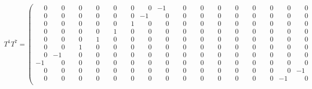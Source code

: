 \documentclass[10pt]{article}
\begin{document}
\[
T^{1}T^{7} = \left(\begin{smallmatrix}
\phantom{-}0 & \phantom{-}0 & \phantom{-}0 & \phantom{-}0 & \phantom{-}0 & \phantom{-}0 & \phantom{-}0 & -1 & \phantom{-}0 & \phantom{-}0 & \phantom{-}0 & \phantom{-}0 & \phantom{-}0 & \phantom{-}0 & \phantom{-}0 & \phantom{-}0 \\
\phantom{-}0 & \phantom{-}0 & \phantom{-}0 & \phantom{-}0 & \phantom{-}0 & \phantom{-}0 & -1 & \phantom{-}0 & \phantom{-}0 & \phantom{-}0 & \phantom{-}0 & \phantom{-}0 & \phantom{-}0 & \phantom{-}0 & \phantom{-}0 & \phantom{-}0 \\
\phantom{-}0 & \phantom{-}0 & \phantom{-}0 & \phantom{-}0 & \phantom{-}0 & \phantom{-}1 & \phantom{-}0 & \phantom{-}0 & \phantom{-}0 & \phantom{-}0 & \phantom{-}0 & \phantom{-}0 & \phantom{-}0 & \phantom{-}0 & \phantom{-}0 & \phantom{-}0 \\
\phantom{-}0 & \phantom{-}0 & \phantom{-}0 & \phantom{-}0 & \phantom{-}1 & \phantom{-}0 & \phantom{-}0 & \phantom{-}0 & \phantom{-}0 & \phantom{-}0 & \phantom{-}0 & \phantom{-}0 & \phantom{-}0 & \phantom{-}0 & \phantom{-}0 & \phantom{-}0 \\
\phantom{-}0 & \phantom{-}0 & \phantom{-}0 & \phantom{-}1 & \phantom{-}0 & \phantom{-}0 & \phantom{-}0 & \phantom{-}0 & \phantom{-}0 & \phantom{-}0 & \phantom{-}0 & \phantom{-}0 & \phantom{-}0 & \phantom{-}0 & \phantom{-}0 & \phantom{-}0 \\
\phantom{-}0 & \phantom{-}0 & \phantom{-}1 & \phantom{-}0 & \phantom{-}0 & \phantom{-}0 & \phantom{-}0 & \phantom{-}0 & \phantom{-}0 & \phantom{-}0 & \phantom{-}0 & \phantom{-}0 & \phantom{-}0 & \phantom{-}0 & \phantom{-}0 & \phantom{-}0 \\
\phantom{-}0 & -1 & \phantom{-}0 & \phantom{-}0 & \phantom{-}0 & \phantom{-}0 & \phantom{-}0 & \phantom{-}0 & \phantom{-}0 & \phantom{-}0 & \phantom{-}0 & \phantom{-}0 & \phantom{-}0 & \phantom{-}0 & \phantom{-}0 & \phantom{-}0 \\
-1 & \phantom{-}0 & \phantom{-}0 & \phantom{-}0 & \phantom{-}0 & \phantom{-}0 & \phantom{-}0 & \phantom{-}0 & \phantom{-}0 & \phantom{-}0 & \phantom{-}0 & \phantom{-}0 & \phantom{-}0 & \phantom{-}0 & \phantom{-}0 & \phantom{-}0 \\
\phantom{-}0 & \phantom{-}0 & \phantom{-}0 & \phantom{-}0 & \phantom{-}0 & \phantom{-}0 & \phantom{-}0 & \phantom{-}0 & \phantom{-}0 & \phantom{-}0 & \phantom{-}0 & \phantom{-}0 & \phantom{-}0 & \phantom{-}0 & \phantom{-}0 & -1 \\
\phantom{-}0 & \phantom{-}0 & \phantom{-}0 & \phantom{-}0 & \phantom{-}0 & \phantom{-}0 & \phantom{-}0 & \phantom{-}0 & \phantom{-}0 & \phantom{-}0 & \phantom{-}0 & \phantom{-}0 & \phantom{-}0 & \phantom{-}0 & -1 & \phantom{-}0 \\

\end{smallmatrix}\]
\end{document}

